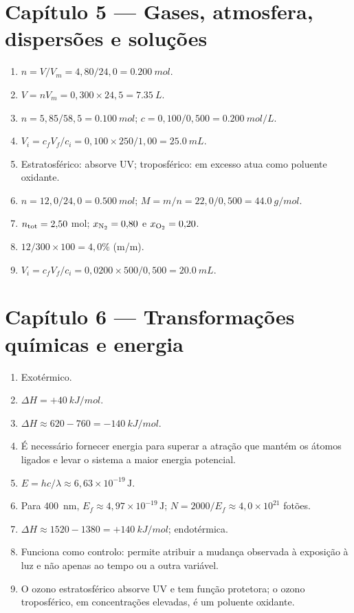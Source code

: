 \documentclass[11pt,a4paper,oneside]{book}
\begin{document}
\section*{Capítulo 5 — Gases, atmosfera, dispersões e soluções}
\begin{enumerate}
  \item $n=V/V_m=4{,}80/24{,}0=\SI{0.200}{mol}$.
  \item $V=nV_m=0{,}300\times24{,}5=\SI{7.35}{L}$.
  \item $n=5{,}85/58{,}5=\SI{0.100}{mol}$; $c=0{,}100/0{,}500=\SI{0.200}{mol/L}$.
  \item $V_i=c_fV_f/c_i=0{,}100\times250/1{,}00=\SI{25.0}{mL}$.
  \item Estratosférico: absorve UV; troposférico: em excesso atua como poluente oxidante.
  \item $n=12{,}0/24{,}0=\SI{0.500}{mol}$; $M=m/n=22{,}0/0{,}500=\SI{44.0}{g/mol}$.
  \item $n_{\rm tot}=2{,}50$ mol; $x_{\ce{N2}}=0{,}80$ e $x_{\ce{O2}}=0{,}20$.
  \item $12/300\times100=4{,}0\%$ (m/m).
  \item $V_i=c_fV_f/c_i=0{,}0200\times500/0{,}500=\SI{20.0}{mL}$.
\end{enumerate}

\section*{Capítulo 6 — Transformações químicas e energia}
\begin{enumerate}
  \item Exotérmico.
  \item $\Delta H=+\SI{40}{kJ/mol}$.
  \item $\Delta H\approx620-760=-\SI{140}{kJ/mol}$.
  \item É necessário fornecer energia para superar a atração que mantém os átomos ligados e levar o sistema a maior energia potencial.
  \item $E=hc/\lambda\approx6{,}63\times10^{-19}\,\mathrm{J}$.
  \item Para \SI{400}{nm}, $E_f\approx4{,}97\times10^{-19}\,\mathrm{J}$; $N=2000/E_f\approx4{,}0\times10^{21}$ fotões.
  \item $\Delta H\approx1520-1380=+\SI{140}{kJ/mol}$; endotérmica.
  \item Funciona como controlo: permite atribuir a mudança observada à exposição à luz e não apenas ao tempo ou a outra variável.
  \item O ozono estratosférico absorve UV e tem função protetora; o ozono troposférico, em concentrações elevadas, é um poluente oxidante.
\end{enumerate}
\end{document}
